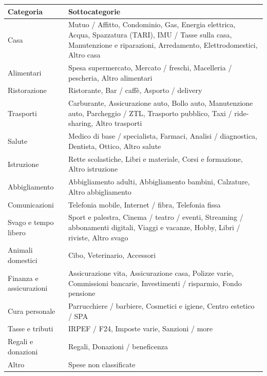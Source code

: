 \documentclass[11pt, a4paper]{article}
\begin{document}
\begin{center}
\small
\begin{longtable}{@{}L{4cm} L{9cm}@{}}
\toprule
\textbf{Categoria} & \textbf{Sottocategorie} \\
\midrule
\endhead
Casa
  & Mutuo / Affitto, Condominio, Gas, Energia elettrica, Acqua,
    Spazzatura (TARI), IMU / Tasse sulla casa, Manutenzione e riparazioni,
    Arredamento, Elettrodomestici, Altro casa \\[4pt]
Alimentari
  & Spesa supermercato, Mercato / freschi, Macelleria / pescheria,
    Altro alimentari \\[4pt]
Ristorazione
  & Ristorante, Bar / caffè, Asporto / delivery \\[4pt]
Trasporti
  & Carburante, Assicurazione auto, Bollo auto, Manutenzione auto,
    Parcheggio / ZTL, Trasporto pubblico, Taxi / ride-sharing,
    Altro trasporti \\[4pt]
Salute
  & Medico di base / specialista, Farmaci, Analisi / diagnostica,
    Dentista, Ottico, Altro salute \\[4pt]
Istruzione
  & Rette scolastiche, Libri e materiale, Corsi e formazione,
    Altro istruzione \\[4pt]
Abbigliamento
  & Abbigliamento adulti, Abbigliamento bambini, Calzature,
    Altro abbigliamento \\[4pt]
Comunicazioni
  & Telefonia mobile, Internet / fibra, Telefonia fissa \\[4pt]
Svago e tempo libero
  & Sport e palestra, Cinema / teatro / eventi,
    Streaming / abbonamenti digitali,
    Viaggi e vacanze, Hobby, Libri / riviste, Altro svago \\[4pt]
Animali domestici
  & Cibo, Veterinario, Accessori \\[4pt]
Finanza e assicurazioni
  & Assicurazione vita, Assicurazione casa, Polizze varie,
    Commissioni bancarie, Investimenti / risparmio,
    Fondo pensione \\[4pt]
Cura personale
  & Parrucchiere / barbiere, Cosmetici e igiene,
    Centro estetico / SPA \\[4pt]
Tasse e tributi
  & IRPEF / F24, Imposte varie, Sanzioni / more \\[4pt]
Regali e donazioni
  & Regali, Donazioni / beneficenza \\[4pt]
Altro
  & Spese non classificate \\
\bottomrule
\end{longtable}
\end{center}
\end{document}
